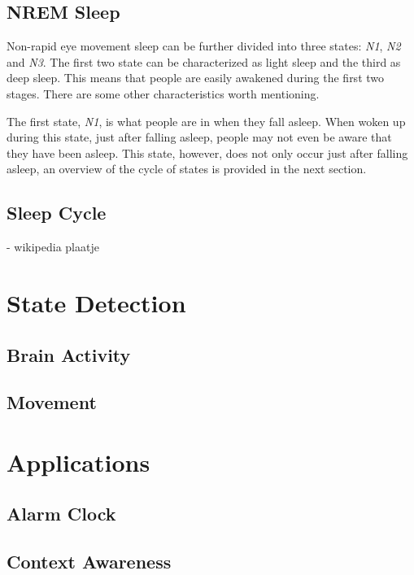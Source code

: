 \subsection{NREM Sleep} %
\label{sub:non_rem_sleep}
Non-rapid eye movement sleep can be further divided into three states: \emph{N1}, \emph{N2} and \emph{N3}. The first two state can be characterized as light sleep and the third as deep sleep. This means that people are easily awakened during the first two stages. There are some other characteristics worth mentioning.

The first state, \emph{N1}, is what people are in when they fall asleep. When woken up during this state, just after falling asleep, people may not even be aware that they have been asleep. This state, however, does not only occur just after falling asleep, an overview of the cycle of states is provided in the next section.

\subsection{Sleep Cycle} %
\label{sub:sleep_cycle}
- wikipedia plaatje


\section{State Detection} %
\label{sec:state_detection}

\subsection{Brain Activity} %
\label{sub:brain_activity}


\subsection{Movement} %
\label{sub:movement}



\section{Applications} %
\label{sec:applications}

\subsection{Alarm Clock} %
\label{sub:alarm_clock}


\subsection{Context Awareness} %
\label{sub:context_awareness}




